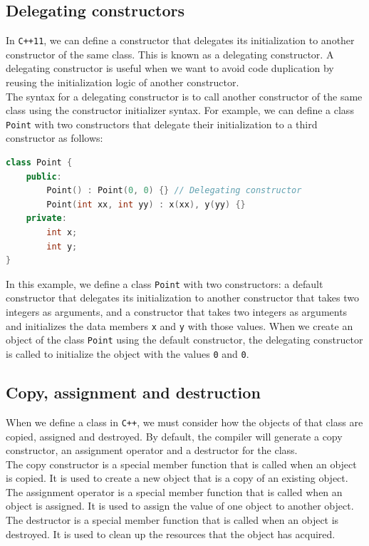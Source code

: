 \subsection{Delegating constructors}

In \texttt{C++11}, we can define a constructor that delegates its initialization to another
constructor of the same class. This is known as a delegating constructor. A delegating
constructor is useful when we want to avoid code duplication by reusing the initialization
logic of another constructor.\\

The syntax for a delegating constructor is to call another constructor of the same class
using the constructor initializer syntax. For example, we can define a class \texttt{Point}
with two constructors that delegate their initialization to a third constructor as follows:\\

\begin{lstlisting}[language=C++]
class Point {
    public:
        Point() : Point(0, 0) {} // Delegating constructor
        Point(int xx, int yy) : x(xx), y(yy) {}
    private:
        int x;
        int y;
}
\end{lstlisting}

In this example, we define a class \texttt{Point} with two constructors: a default constructor
that delegates its initialization to another constructor that takes two integers as arguments,
and a constructor that takes two integers as arguments and initializes the data members \texttt{x}
and \texttt{y} with those values. When we create an object of the class \texttt{Point} using the
default constructor, the delegating constructor is called to initialize the object with the values
\texttt{0} and \texttt{0}.

\subsection{Copy, assignment and destruction}

When we define a class in \texttt{C++}, we must consider how the objects of that class are
copied, assigned and destroyed. By default, the compiler will generate a copy constructor, an
assignment operator and a destructor for the class.\\

The copy constructor is a special member function that is called when an object is copied. It
is used to create a new object that is a copy of an existing object. The assignment operator
is a special member function that is called when an object is assigned. It is used to assign
the value of one object to another object. The destructor is a special member function that
is called when an object is destroyed. It is used to clean up the resources that the object
has acquired.

